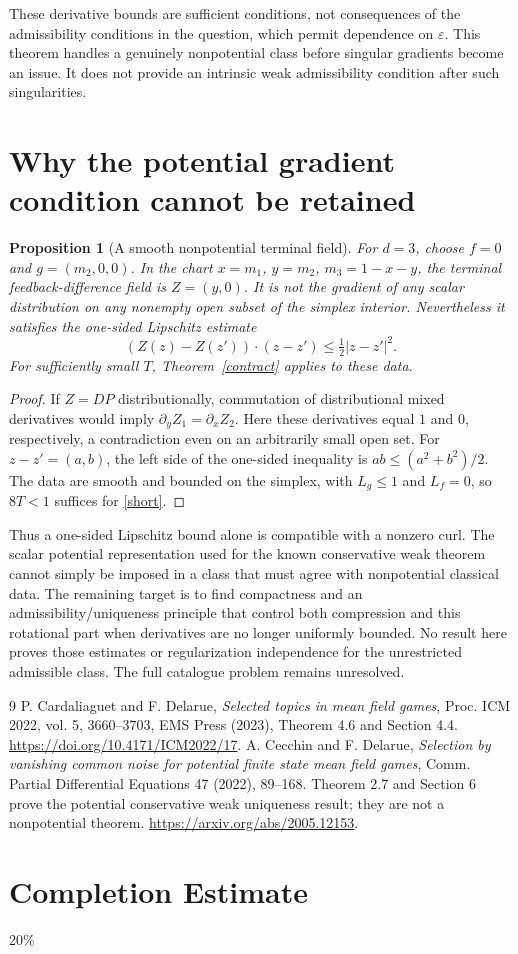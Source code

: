 \documentclass[11pt]{article}
\newtheorem{proposition}[theorem]{Proposition}
\begin{document}
These derivative bounds are sufficient conditions, not consequences of the admissibility conditions in the question, which permit dependence on $\varepsilon$. This theorem handles a genuinely nonpotential class before singular gradients become an issue. It does not provide an intrinsic weak admissibility condition after such singularities.

\section{Why the potential gradient condition cannot be retained}
\begin{proposition}[A smooth nonpotential terminal field]\label{curl}
For $d=3$, choose $f=0$ and $g=(m_2,0,0)$. In the chart $x=m_1$, $y=m_2$, $m_3=1-x-y$, the terminal feedback-difference field is $Z=(y,0)$. It is not the gradient of any scalar distribution on any nonempty open subset of the simplex interior. Nevertheless it satisfies the one-sided Lipschitz estimate
\[
 (Z(z)-Z(z'))\cdot(z-z')\le\tfrac12|z-z'|^2.
\]
For sufficiently small $T$, Theorem~\ref{contract} applies to these data.
\end{proposition}
\begin{proof}
If $Z=DP$ distributionally, commutation of distributional mixed derivatives would imply $\partial_yZ_1=\partial_xZ_2$. Here these derivatives equal $1$ and $0$, respectively, a contradiction even on an arbitrarily small open set. For $z-z'=(a,b)$, the left side of the one-sided inequality is $ab\le(a^2+b^2)/2$. The data are smooth and bounded on the simplex, with $L_g\le1$ and $L_f=0$, so $8T<1$ suffices for \eqref{short}.
\end{proof}

Thus a one-sided Lipschitz bound alone is compatible with a nonzero curl. The scalar potential representation used for the known conservative weak theorem cannot simply be imposed in a class that must agree with nonpotential classical data. The remaining target is to find compactness and an admissibility/uniqueness principle that control both compression and this rotational part when derivatives are no longer uniformly bounded. No result here proves those estimates or regularization independence for the unrestricted admissible class. The full catalogue problem remains unresolved.

\begin{thebibliography}{9}
 P. Cardaliaguet and F. Delarue, \emph{Selected topics in mean field games}, Proc. ICM 2022, vol. 5, 3660--3703, EMS Press (2023), Theorem 4.6 and Section 4.4. \url{https://doi.org/10.4171/ICM2022/17}.
 A. Cecchin and F. Delarue, \emph{Selection by vanishing common noise for potential finite state mean field games}, Comm. Partial Differential Equations 47 (2022), 89--168. Theorem 2.7 and Section 6 prove the potential conservative weak uniqueness result; they are not a nonpotential theorem. \url{https://arxiv.org/abs/2005.12153}.
\end{thebibliography}

\section{Completion Estimate}
20\%
\end{document}
